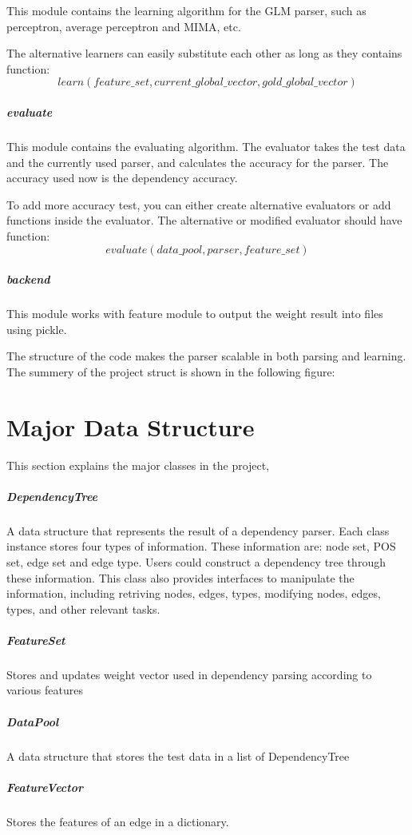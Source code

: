 \documentclass[11pt]{article}
\begin{document}
This module contains the learning algorithm for the GLM parser, such as perceptron, average perceptron and MIMA, etc. 

The alternative learners can easily substitute each other as long as they contains function: 
	$$ learn(feature\_set, current\_global\_vector, gold\_global\_vector) $$

\subparagraph{evaluate}

This module contains the evaluating algorithm. The evaluator takes the test data and the currently used parser, and calculates the accuracy for the parser. The accuracy used now is the dependency accuracy.

To add more accuracy test, you can either create alternative evaluators or add functions inside the evaluator. The alternative or modified evaluator should have function:
	$$ evaluate(data\_pool, parser, feature\_set) $$

\subparagraph{backend}

This module works with feature module to output the weight result into files using pickle.

The structure of the code makes the parser scalable in both parsing and learning. The summery of the project struct is shown in the following figure:




\section{Major Data Structure}

This section explains the major classes in the project,

\subparagraph{DependencyTree}
A data structure that represents the result of a dependency parser. Each class instance stores four types of information. These information are: node set, POS set, edge set and edge type. Users could construct a dependency tree through these information. This class also provides interfaces to manipulate the information, including retriving nodes, edges, types, modifying nodes, edges, types, and other relevant tasks.

\subparagraph{FeatureSet}
Stores and updates weight vector used in dependency parsing according to
various features

\subparagraph{DataPool}
A data structure that stores the test data in a list of DependencyTree

\subparagraph{FeatureVector}
Stores the features of an edge in a dictionary.
\end{document}
